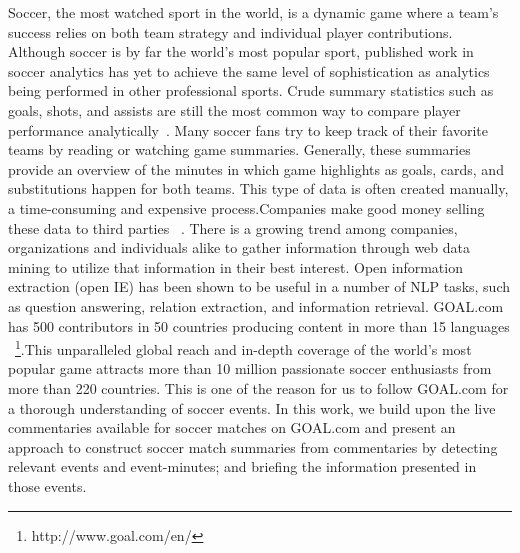 \documentclass[11pt,letterpaper]{article}
\begin{document}
Soccer, the most watched sport in the world, is a dynamic game where a team’s success relies on both team strategy and individual player contributions. Although soccer is by far the world's most popular sport, published work in soccer analytics has yet to achieve
the same level of sophistication as analytics being performed
in other professional sports. Crude summary statistics such
as goals, shots, and assists are still the most common way
to compare player performance analytically~\cite{brooks2016developing}.
Many soccer fans try to keep track of their favorite teams by reading or watching game summaries. Generally, these summaries provide an overview of the minutes in which game highlights as goals, cards, and substitutions happen for both teams. This type of data is often created manually, a time-consuming and expensive process.Companies make good money selling these data to
third parties ~\cite{van2012automatic}.  There is a growing trend among companies, organizations and individuals alike to gather information through web data mining to utilize that information in their best interest. Open information extraction (open IE) has been shown to be useful in a number of NLP tasks, such as question answering, relation extraction, and information retrieval.
GOAL.com has 500 contributors in 50 countries producing content in more than 15 languages ~\footnote{http://www.goal.com/en/}.This unparalleled global reach and in-depth coverage of the world's most popular game attracts more than 10 million passionate soccer enthusiasts from more than 220 countries. This is one of the reason for us to follow GOAL.com for a thorough understanding of soccer events. In this work, we build upon the live commentaries available for soccer matches on GOAL.com and present an approach to construct soccer match summaries from commentaries by detecting relevant events and event-minutes; and briefing the information presented in those events. \\
\end{document}
